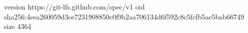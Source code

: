 version https://git-lfs.github.com/spec/v1
oid sha256:4eea260059d3ce7231908850c0f9b2aa706134d6f592c8c5fcfb5ae5bab66749
size 4364
